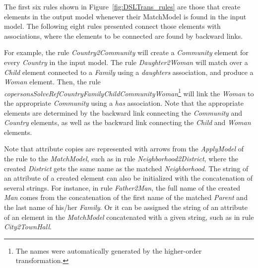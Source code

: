 The first six rules shown in Figure~\ref{fig:DSLTrans_rules} are those that create elements in the output model whenever their MatchModel is found in the input model. The following eight rules presented connect those elements with associations, where the elements to be connected are found by backward links.

For example, the rule \emph{Country2Community} will create a \emph{Community} element for every \emph{Country} in the input model. The rule \emph{Daughter2Woman} will match over a \emph{Child} element connected to a \emph{Family} using a \emph{daughters} association, and produce a \emph{Woman} element. Then, the rule \emph{copersonsSolveRefCountryFamilyChildCommunityWoman}\footnote{The names were automatically generated by the higher-order transformation.} will link the \textit{Woman} to the appropriate \textit{Community} using a \textit{has} association. Note that the appropriate elements are determined by the backward link connecting the \emph{Community} and \emph{Country} elements, as well as the backward link connecting the \emph{Child} and \emph{Woman} elements. 


Note that attribute copies are represented with arrows from the \emph{ApplyModel} of the rule to the \emph{MatchModel}, such as in rule \emph{Neighborhood2District}, where the created \emph{District} gets the same name as the matched \emph{Neighborhood}.
The string of an attribute of a created element can also be initialized with the concatenation of several strings.
For instance, in rule \emph{Father2Man}, the full name of the created \emph{Man} comes from the concatenation of the first name of the matched \emph{Parent} and the last name of his/her \emph{Family}.
Or it can be assigned the string of an attribute of an element in the \emph{MatchModel} concatenated with a given string, such as in rule \emph{City2TownHall}.



